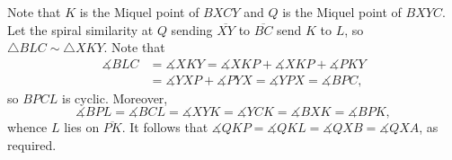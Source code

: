 Note that $K$ is the Miquel point of $BXCY$ and $Q$ is the Miquel point of $BXYC$. Let the spiral similarity at $Q$ sending $\overline{XY}$ to $\overline{BC}$ send $K$ to $L$, so $\triangle BLC\sim\triangle XKY$. Note that
\begin{align*}
    \measuredangle BLC&=\measuredangle XKY=\measuredangle XKP+\measuredangle XKP+\measuredangle PKY\\
    &=\measuredangle YXP+\measuredangle PYX=\measuredangle YPX=\measuredangle BPC,
\end{align*}
so $BPCL$ is cyclic. Moreover, \[\measuredangle BPL=\measuredangle BCL=\measuredangle XYK=\measuredangle YCK=\measuredangle BXK=\measuredangle BPK,\]
whence $L$ lies on $\overline{PK}$. It follows that $\measuredangle QKP=\measuredangle QKL=\measuredangle QXB=\measuredangle QXA$, as required.

